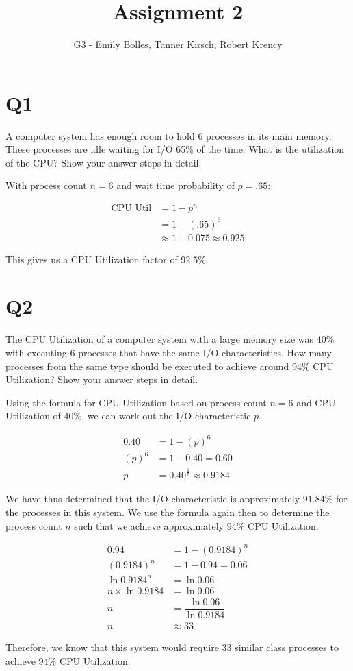 \documentclass[12pt]{article}
\title{Assignment 2}
\author{G3 - Emily Bolles, Tanner Kirsch, Robert Krency}
\date{}
\begin{document}
\maketitle

\section*{Q1}

A computer system has enough room to hold 6 processes in its main memory.
These processes are idle waiting for I/O 65\% of the time.
What is the utilization of the CPU?
Show your answer steps in detail.

With process count \(n=6\) and wait time probability of \(p=.65\):
 
\begin{align*}
    \textrm{CPU\_Util} & = 1 - p^n \\
     & = 1 - {(.65)}^6 \\
     & \approx 1 - 0.075 \approx 0.925
\end{align*}

This gives us a CPU Utilization factor of \(92.5\%\).


\section*{Q2}

The CPU Utilization of a computer system with a large memory size was \(40\% \) with executing 6 processes that have the same I/O characteristics.
How many processes from the same type should be executed to achieve around \(94\%\) CPU Utilization?
Show your answer steps in detail.

Using the formula for CPU Utilization based on process count \(n=6\) and CPU Utilization of \(40\%\), we can work out the I/O characteristic \(p\).

\begin{align*}
    0.40 & = 1 - {(p)}^6 \\
    {(p)}^6 & = 1 - 0.40 = 0.60 \\
    p & = {0.40}^\frac{1}{6} \approx 0.9184
\end{align*}

We have thus determined that the I/O characteristic is approximately \(91.84\%\) for the processes in this system.
We use the formula again then to determine the process count \(n\) such that we achieve approximately \(94\%\) CPU Utilization.

\begin{align*}
    0.94 & = 1 - {(0.9184)}^n \\
    {(0.9184)}^n & = 1 - 0.94 = 0.06 \\
    \ln{0.9184^n} & = \ln{0.06} \\
    n \times \ln{0.9184} & = \ln{0.06} \\
    n & = \dfrac{\ln{0.06}}{\ln{0.9184}} \\
    n & \approx 33
\end{align*}

Therefore, we know that this system would require \(33\) similar class processes to achieve \(94\%\) CPU Utilization.
\end{document}

